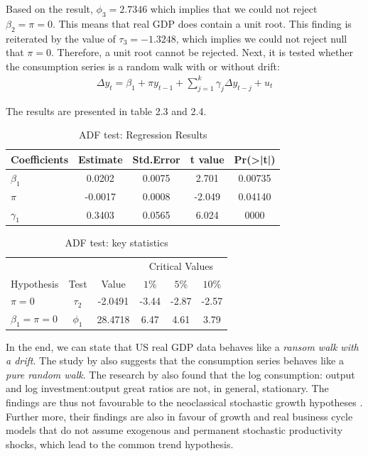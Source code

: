 \documentclass[12pt]{article}
\theoremstyle{definition}
\numberwithin{equation}{section}
\numberwithin{figure}{section}
\numberwithin{table}{section}
\begin{document}
Based on the result, $\phi_3 = 2.7346$ which implies that we could not reject $\beta_2 = \pi = 0$. This means that real GDP does contain a unit root. This finding is reiterated by the value of $\tau_3 = -1.3248$, which implies we could not reject null that $\pi = 0$. Therefore, a unit root cannot be rejected. Next, it is tested whether the consumption series is a random walk with or without drift:
\begin{align*}
  \Delta y_t = \beta_1 + \pi y_{t-1} + \sum_{j=1}^k \gamma_j \Delta y_{t-j} + u_t
\end{align*}

The results are presented in table 2.3 and 2.4.
\begin{table}[H]
  \centering
  \renewcommand{\arraystretch}{1.2}
  \caption{ADF test: Regression Results}
  \begin{tabular}{lcccc}
    \hline
    \hline
    Coefficients & Estimate & Std.Error & t value & Pr(>|t|) \\
    \hline
    $\beta_1$ & 0.0202& 0.0075 &  2.701 & 0.00735  \\
    $\pi$ & -0.0017 & 0.0008 &  -2.049 &  0.04140  \\
    $\gamma_1$ & 0.3403&  0.0565 &  6.024 & 0000 \\
    \hline
    \end{tabular}
\end{table}

\begin{table}[H]
  \renewcommand{\arraystretch}{1.2}
  \centering
  \caption{ADF test: key statistics}
  \begin{tabular}{lccccc}
    \hline
    \hline
    & & &  \multicolumn{3}{c}{Critical Values} \\
    \cline{4-6}
    Hypothesis & Test &  Value & $1\%$ & $5\%$ & $10\%$ \\
    $\pi = 0$ & $\tau_2$ & -2.0491 & -3.44 & -2.87 &  -2.57 \\
    $\beta_1 = \pi = 0$ & $\phi_1$ & 28.4718 &  6.47  & 4.61 &  3.79  \\
    \hline
  \end{tabular}
\end{table}

In the end, we can state that US real GDP data behaves like a \textit{ransom walk with a drift}. The study by \cite{holden1994unit} also suggests that the consumption series behaves like a \textit{pure random walk}. The research by \cite{harvey2003great} also found that the log consumption: output and log investment:output great ratios are not, in general, stationary. The findings are thus not favourable to the neoclassical stochastic growth hypotheses \citep{harvey2003great}. Further more,  their findings are also in favour of growth and real business cycle models that do not assume exogenous and permanent stochastic productivity shocks, which lead to the common trend hypothesis.


\newpage


\end{document}
